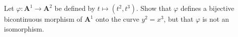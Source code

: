 Let $\varphi: \mathbf{A}^1 \to \mathbf{A}^2$ be defined by $t \mapsto (t^2, t^3)$. Show that $\varphi$ defines a bijective bicontinuous morphism of $\mathbf{A}^1$ onto the curve $y^2 = x^3$, but that $\varphi$ is not an isomorphism.
